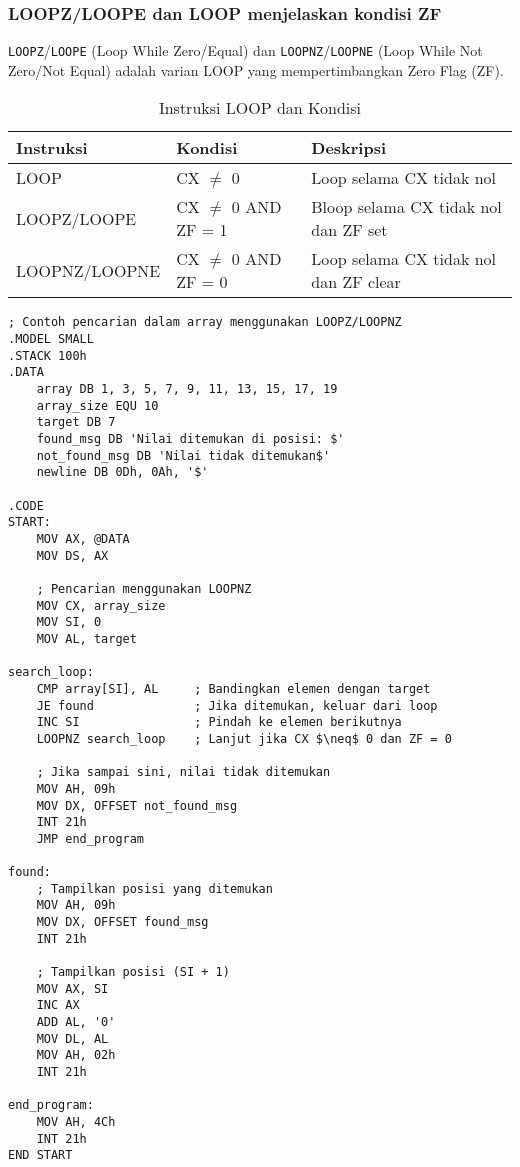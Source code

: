 \documentclass[../main.tex]{subfiles}
\begin{document}
            \subsubsection{LOOPZ/LOOPE dan LOOP menjelaskan kondisi ZF}
\texttt{LOOPZ}/\texttt{LOOPE} (Loop While Zero/Equal) dan \texttt{LOOPNZ}/\texttt{LOOPNE} (Loop While Not Zero/Not Equal) adalah varian LOOP yang mempertimbangkan Zero Flag (ZF).

\begin{table}[H]
\centering
\caption{Instruksi LOOP dan Kondisi}
\begin{tabular}{|l|l|l|}
\hline
\textbf{Instruksi} & \textbf{Kondisi} & \textbf{Deskripsi} \\
\hline
LOOP & CX $\neq$ 0 & Loop selama CX tidak nol \\
LOOPZ/LOOPE & CX $\neq$ 0 AND ZF = 1 & Bloop selama CX tidak nol dan ZF set \\
LOOPNZ/LOOPNE & CX $\neq$ 0 AND ZF = 0 & Loop selama CX tidak nol dan ZF clear \\
\hline
\end{tabular}
\end{table}

\begin{lstlisting}[language={[x86masm]Assembler}, caption=Contoh Penggunaan LOOPZ dan LOOPNZ, label={lst:loopz-loopnz}]
; Contoh pencarian dalam array menggunakan LOOPZ/LOOPNZ
.MODEL SMALL
.STACK 100h
.DATA
    array DB 1, 3, 5, 7, 9, 11, 13, 15, 17, 19
    array_size EQU 10
    target DB 7
    found_msg DB 'Nilai ditemukan di posisi: $'
    not_found_msg DB 'Nilai tidak ditemukan$'
    newline DB 0Dh, 0Ah, '$'
    
.CODE
START:
    MOV AX, @DATA
    MOV DS, AX
    
    ; Pencarian menggunakan LOOPNZ
    MOV CX, array_size
    MOV SI, 0
    MOV AL, target
    
search_loop:
    CMP array[SI], AL     ; Bandingkan elemen dengan target
    JE found              ; Jika ditemukan, keluar dari loop
    INC SI                ; Pindah ke elemen berikutnya
    LOOPNZ search_loop    ; Lanjut jika CX $\neq$ 0 dan ZF = 0
    
    ; Jika sampai sini, nilai tidak ditemukan
    MOV AH, 09h
    MOV DX, OFFSET not_found_msg
    INT 21h
    JMP end_program
    
found:
    ; Tampilkan posisi yang ditemukan
    MOV AH, 09h
    MOV DX, OFFSET found_msg
    INT 21h
    
    ; Tampilkan posisi (SI + 1)
    MOV AX, SI
    INC AX
    ADD AL, '0'
    MOV DL, AL
    MOV AH, 02h
    INT 21h
    
end_program:
    MOV AH, 4Ch
    INT 21h
END START
\end{lstlisting}
\end{document}
